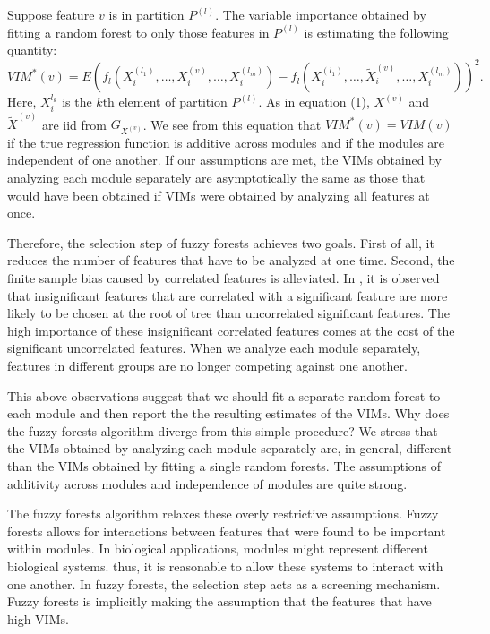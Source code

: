 \documentclass[article,shortnames]{jss}
\begin{document}
Suppose feature $v$ is in partition $P^{(l)}$.  The variable importance obtained by fitting a random forest to only those features in  $P^{(l)}$
 is estimating the following quantity: 
 \begin{equation}
 VIM^{*}(v)=E(f_{l}(X^{(l_{1})}_{i},\ldots,X^{(v)}_{i},\ldots,X^{(l_{m})}_{i}) - f_{l}(X^{(l_{1})}_{i},\ldots,\tilde{X}^{(v)}_{i},\ldots,X^{(l_{m})}_{i}))^{2}.
 \end{equation}
 Here, $X_{i}^{l_{k}}$ is the $k$th element of partition $P^{(l)}$. As in equation (1), $X^{(v)}$ and $\tilde{X}^{(v)}$ are iid from $G_{X^{(v)}}$.
 We see from this equation that $VIM^{*}(v)=VIM(v)$ if the true regression function is additive across modules and if the modules are independent
 of one another.  If our assumptions are met, the VIMs obtained by analyzing each module separately are asymptotically the same as those that 
would have been obtained if VIMs were obtained by analyzing all features at once.       

Therefore, the selection step of fuzzy forests achieves two goals.  First of all, it reduces the number of features that have to be 
analyzed at one time.  Second, the finite sample bias caused by correlated features is alleviated.  In 
\citep{nicodemus2009predictor}, it is observed that insignificant features that are correlated with a significant feature 
are more likely to be chosen at the root of tree than uncorrelated significant features.  The high importance of these insignificant
correlated features comes at the cost of the significant uncorrelated features.  When we analyze each module separately, features 
in different groups are no longer competing against one another.   

This above observations suggest that we should fit a separate random forest to each module and then report the the resulting
estimates of the VIMs.  Why does the fuzzy forests algorithm diverge from this simple procedure?
We stress that the VIMs obtained by analyzing each module separately are, in general, different than the VIMs obtained
by fitting a single random forests.  The assumptions of additivity across modules and independence of modules are quite strong.

The fuzzy forests algorithm relaxes these overly restrictive assumptions.  Fuzzy forests allows for interactions between features that
were found to be important within modules.  In biological applications, modules might represent different biological systems.
thus, it is reasonable to allow these systems to interact with one another.  In fuzzy forests, the selection step acts as a screening mechanism.
Fuzzy forests is implicitly making the assumption that the features that have high VIMs.   
\end{document}
